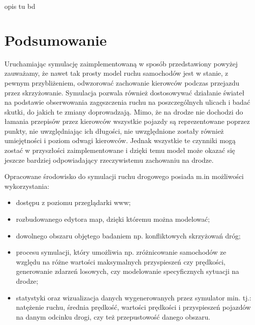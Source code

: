 \documentclass{sprawozdanie-agh}
\begin{document}
\begin{multicols}{2}
		opis tu bd


		\section{Podsumowanie}

		Uruchamiając symulację zaimplementowaną w sposób przedstawiony powyżej zauważamy, że nawet tak prosty model ruchu samochodów jest w stanie, z pewnym przybliżeniem, odwzorować zachowanie kierowców podczas przejazdu przez skrzyżowanie. Symulacja pozwala również dostosowywać działanie świateł na podstawie obserwowania zagęszczenia ruchu na poszczególnych ulicach i badać skutki, do jakich te zmiany doprowadzają. Mimo, że na drodze nie dochodzi do łamania przepisów przez kierowców wszystkie pojazdy są reprezentowane poprzez punkty, nie uwzględniając ich długości, nie uwzględnione zostały również umiejętności i poziom odwagi kierowców. Jednak wszystkie te czynniki mogą zostać w przyszłości zaimplementowane i dzięki temu model może okazać się jeszcze bardziej odpowiadający rzeczywistemu zachowaniu na drodze.

		Opracowane środowisko do symulacji ruchu drogowego posiada m.in możliwości wykorzystania:
		\begin{itemize}
			\item dostępu z poziomu przeglądarki www;
			\item rozbudowanego  edytora map, dzięki któremu można modelować;
			\item dowolnego obszaru objętego badaniem np. konfliktowych skrzyżowań dróg;
			\item procesu symulacji, który umożliwia np. zróżnicowanie samochodów ze względu na różne wartości maksymalnych przyspieszeń czy prędkości, generowanie zdarzeń losowych, czy modelowanie specyficznych sytuacji na drodze;
			\item statystyki oraz wizualizacja danych wygenerowanych przez symulator min. tj.: natężenie ruchu, średnia prędkość, wartości prędkości i przyspieszeń pojazdów na danym odcinku drogi, czy też przepustowość danego obszaru.
		\end{itemize}


	\end{multicols}
\end{document}
